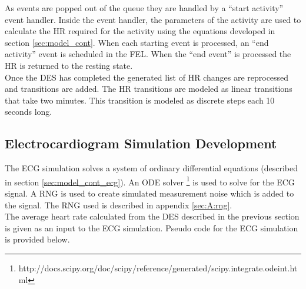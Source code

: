 \documentclass[paper=a4, fontsize=11pt]{scrartcl}
\numberwithin{equation}{section}		%
\numberwithin{figure}{section}			%
\numberwithin{table}{section}		    %
\begin{document}
As events are popped out of the queue they are handled by a ``start activity'' event handler. 
Inside the event handler, the parameters of the activity are used to calculate the HR required
for the activity using the equations developed in section \ref{sec:model_cont}. When each 
starting event is processed, an ``end activity'' event is scheduled in the FEL. When the ``end 
event'' is processed the HR is returned to the resting state.\\

Once the DES has completed the generated list of HR changes are reprocessed and transitions
are added. The HR transitions are modeled as linear transitions that take two minutes. This
transition is modeled as discrete steps each 10 seconds long. 

\subsection{Electrocardiogram Simulation Development}\label{sec:simdev_ecg}
The ECG simulation solves a system of ordinary differential equations (described in section
\ref{sec:model_cont_ecg}). An ODE solver
\footnote{http://docs.scipy.org/doc/scipy/reference/generated/scipy.integrate.odeint.html}
is used to solve for the ECG signal. A RNG is used to create simulated measurement noise
which is added to the signal. The RNG used is described in appendix \ref{sec:A:rng}. \\

The average heart rate calculated from the DES described in the previous section is given 
as an input to the ECG simulation. Pseudo code for the ECG simulation is provided below.\\
\end{document}
